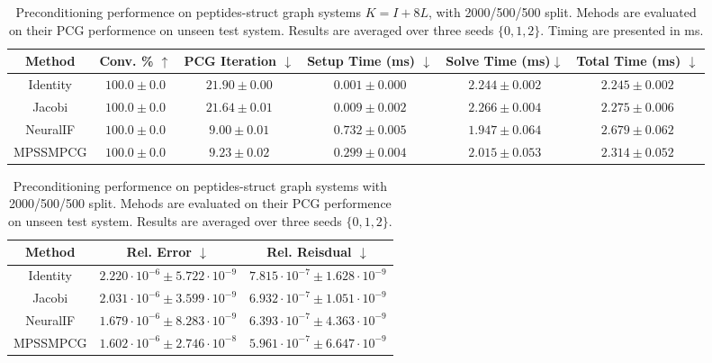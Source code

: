 \begin{table}[H]
    \caption{
        Preconditioning performence on peptides-struct graph systems $K = I +
            8L$, with 2000/500/500 split. Mehods are evaluated on their PCG
        performence on unseen test system. Results are averaged over three
        seeds $\{0,1,2\}$. Timing are presented in ms.
    }
    \centering
    \small
    \label{tbl:peptides_struct_preconditioning_time}
    \begin{tabular}{c c c c c c}
        Method   & Conv. \%   $\uparrow$ & PCG Iteration $\downarrow$ & Setup Time (ms) $\downarrow$ & Solve Time (ms)$\downarrow$ & Total Time (ms)  $\downarrow$ \\
        \hline
        Identity & $100.0\pm0.0$         & $21.90\pm0.00$             & $0.001\pm0.000 $         & $2.244\pm0.002 $        & $2.245\pm0.002$           \\
        Jacobi   & $100.0\pm0.0$         & $21.64\pm0.01$             & $0.009\pm0.002 $         & $2.266\pm0.004 $        & $2.275\pm0.006$           \\
        NeuralIF & $100.0\pm0.0$         & $9.00\pm0.01$              & $0.732\pm0.005 $         & $1.947\pm0.064 $        & $2.679\pm0.062$           \\
        MPSSMPCG & $100.0\pm0.0$         & $9.23\pm0.02$              & $0.299\pm0.004 $         & $2.015\pm0.053 $        & $2.314\pm0.052$           \\
    \end{tabular}
\end{table}

\begin{table}[H]
    \caption{
        Preconditioning performence on peptides-struct graph systems with
        2000/500/500 split. Mehods are evaluated on their PCG performence on
        unseen test system. Results are averaged over three seeds $\{0,1,2\}$.
    }

    \centering
    \small
    \label{tbl:peptides_struct_preconditioning_err}
    \begin{tabular}{c c c}
        Method   & Rel. Error  $\downarrow$                  & Rel. Reisdual  $\downarrow$               \\
        \hline
        Identity & $2.220\cdot 10^{-6}\pm5.722\cdot 10^{-9}$ & $7.815\cdot 10^{-7}\pm1.628\cdot 10^{-9}$ \\
        Jacobi   & $2.031\cdot 10^{-6}\pm3.599\cdot 10^{-9}$ & $6.932\cdot 10^{-7}\pm1.051\cdot 10^{-9}$ \\
        NeuralIF & $1.679\cdot 10^{-6}\pm8.283\cdot 10^{-9}$ & $6.393\cdot 10^{-7}\pm4.363\cdot 10^{-9}$ \\
        MPSSMPCG & $1.602\cdot 10^{-6}\pm2.746\cdot 10^{-8}$ & $5.961\cdot 10^{-7}\pm6.647\cdot 10^{-9}$ \\
    \end{tabular}
\end{table}

